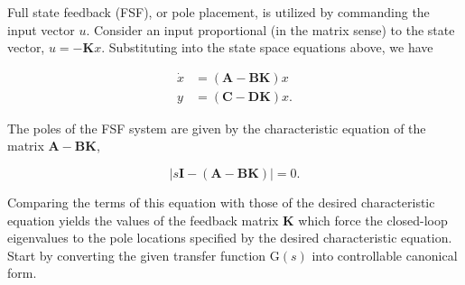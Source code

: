 \documentclass[main.tex]{subfiles}
\begin{document}
\begin{enumerate}
\begin{enumerate}
    Full state feedback (FSF), or pole placement, is utilized by commanding the input vector $u$. Consider an input proportional (in the matrix sense) to the state vector, $u=-\mathbf{K} x$. Substituting into the state space equations above, we have
    
    $$
    \begin{aligned}
    \dot{x} &= (\mathbf{A}-\mathbf{B K}) x \\
    {y} &= (\mathbf{C}-\mathbf{D K}) x.
    \end{aligned}
    $$
    
    The poles of the FSF system are given by the characteristic equation of the matrix $\mathbf{A}-\mathbf{B K}$,
    
    $$
    |s \mathbf{I}-(\mathbf{A}-\mathbf{B K})|=0.
    $$
    
    Comparing the terms of this equation with those of the desired characteristic equation yields the values of the feedback matrix $\mathbf{K}$ which force the closed-loop eigenvalues to the pole locations specified by the desired characteristic equation. Start by converting the given transfer function $\mathrm{G}(s)$ into controllable canonical form.
    

\end{enumerate}
\end{enumerate}
\end{document}
